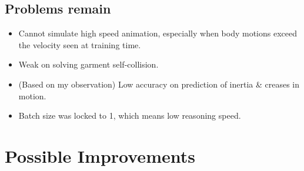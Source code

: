 \documentclass{article}
\begin{document}
\subsection{Problems remain}
\begin{itemize}
    \item Cannot simulate high speed animation, especially when body motions exceed the velocity seen at training time.
    \item Weak on solving garment self-collision.
    \item (Based on my observation) Low accuracy on prediction of inertia \& creases in motion.
    \item Batch size was locked to 1, which means low reasoning speed.
\end{itemize}

\section{Possible Improvements}
\subsection{}



\end{document}
